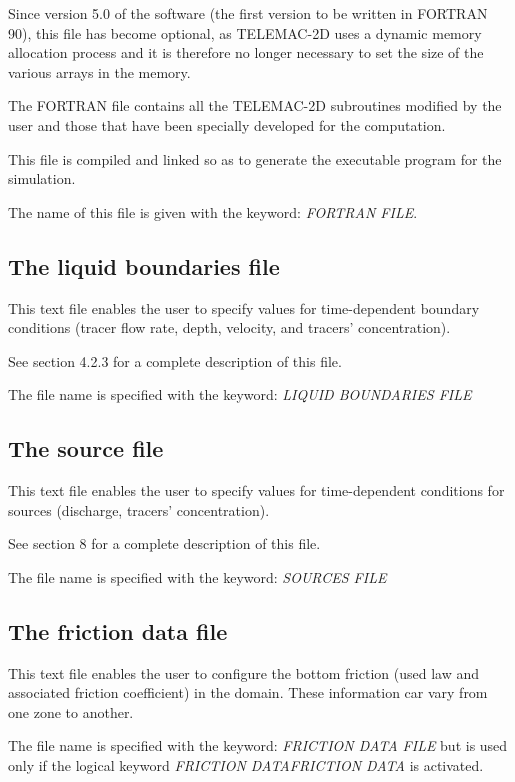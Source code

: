  Since version 5.0 of the software (the first version to be written in FORTRAN 90), this file has become optional, as TELEMAC-2D uses a dynamic memory allocation process and it is therefore no longer necessary to set the size of the various arrays in the memory.

 The FORTRAN file contains all the TELEMAC-2D subroutines modified by the user and those that have been specially developed for the computation.

 This file is compiled and linked so as to generate the executable program for the simulation.

 The name of this file is given with the keyword: \textit{FORTRAN FILE}.


\subsection{ The liquid boundaries file}

 This text file enables the user to specify values for time-dependent boundary conditions (tracer flow rate, depth, velocity, and tracers' concentration).

 See section 4.2.3 for a complete description of this file.

 The file name is specified with the keyword: \textit{LIQUID BOUNDARIES FILE}


\subsection{  The source file}

 This text file enables the user to specify values for time-dependent conditions for sources (discharge, tracers' concentration).

 See section 8 for a complete description of this file.

 The file name is specified with the keyword: \textit{SOURCES FILE}


\subsection{ The friction data file}

 This text file enables the user to configure the bottom friction (used law and associated friction coefficient) in the domain. These information car vary from one zone to another.

 The file name is specified with the keyword: \textit{FRICTION DATA FILE} but is used only if the logical keyword \textit{FRICTION DATAFRICTION DATA} is activated.


